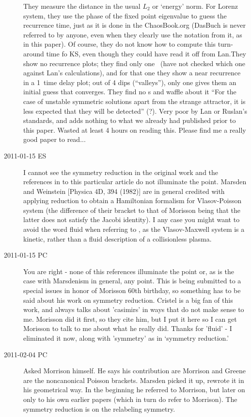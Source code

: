 \begin{description}
They measure the distance in the usual $L_2$ or `energy' norm. For Lorenz
system, they use the phase of the fixed point eigenvalue to guess the
recurrence time, just as it is done in the ChaosBook.org (DasBuch is
never referred to by anyone, even when they clearly use the notation from
it, as in this paper). Of course, they do not know how to compute this
turn-around time fo KS, even though they could have read it off from
Lan.They show no recurrence plots; they find only one \po\
(have not checked which one against Lan's
calculations), and for that one they show a near
recurrence in a 1\dmn\ time delay plot; out of 4 dips (``valleys''), only
one gives them an initial guess that converges. They find no \rpo s and
waffle about it ``For the case of unstable symmetric solutions apart from
the strange attractor, it is less expected that they will be detected''
(?). Very poor by Lan or Ruslan's standards, and adds nothing to what we
already had published prior to this paper. Wasted at least 4 hours on
reading this. Please find me a really good paper to read...

\item[2011-01-15 ES]
I cannot see the symmetry reduction in the original work
and the references in \rf{Morr98} to this particular article do not
illuminate the point. Marsden and Weinstein [Physica 4D, 394 (1982)]
are in general credited with applying reduction
to obtain a Hamiltonian formalism for Vlasov-Poisson system (the difference
of their bracket to that of Morisson being that the latter does not satisfy
the Jacobi identity). I any case you might want to avoid the word fluid when
referring to \rf{Morr80}, as the Vlasov-Maxwell system is a kinetic, rather
than a fluid description of a collisionless plasma.


\item[2011-01-15 PC]
You are right - none of this references illuminate the point or, as is
the case with Marsdenism in general, any point. This is being submitted to
a special issues in honor of Morisson 60th birthday, so something has to be said about
his work on symmetry reduction. Cristel is a big fan of this work, and
always talks about 'casimirs' in ways that do not make sense to me.
Morisson did it first, so they cite him, but I put it here so I can get Morisson
to talk to me about what he really did. Thanks for 'fluid' - I eliminated it now, along
with 'symmetry' as in `symmetry reduction.'

\item[2011-02-04 PC]
Asked Morrison himself. He says his contribution are
Morrison and Greene are the
noncanonical Poisson brackets. Marsden picked it up, rewrote it
in his geometrical way. In
the beginning he referred to Morrison, but later on only to
his own earlier papers (which in turn do refer to Morrison).
The symmetry reduction is on the relabeling symmetry.


\end{description}
